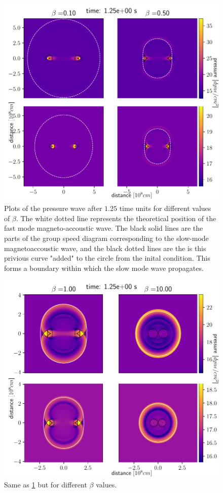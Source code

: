 \begin{figure}[H]
	\centering
	\includegraphics[width=\linewidth]{images/group-speed-pressure1.pdf}
	\caption{Plots of the pressure wave after $1.25$ time units for different values of $\beta$. The white dotted line represents the theoretical position of the fast mode magneto-accoustic wave. The black solid lines are the parts of the group speed diagram corresponding to the slow-mode magnetoaccoustic wave, and the black dotted lines are the is this privious curve "added" to the circle from the inital condition. This forms a boundary within which the slow mode wave propagates.}
	\label{fig:MHD-group1}
\end{figure}

\begin{figure}[H]
	\centering
	\includegraphics[width=\linewidth]{images/group-speed-pressure2.pdf}
	\caption{Same as \cref{fig:MHD-group1} but for different $\beta$ values.}
	\label{fig:MHD-group2}
\end{figure}


